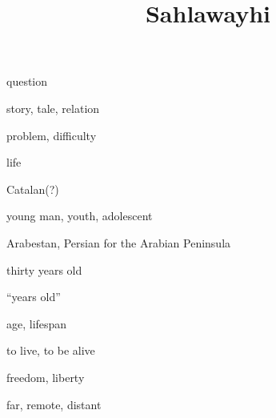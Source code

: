 \documentclass[avery5371,grid,frame]{flashcards}
\title{Sahlawayhi}
\begin{document}
\begin{flashcard}{\LARGE question}
\LARGE {}
\end{flashcard}
\begin{flashcard}{\LARGE story, tale, relation}
\LARGE {}
\end{flashcard}
\begin{flashcard}{\LARGE problem, difficulty}
\LARGE {}
\end{flashcard}
\begin{flashcard}{\LARGE life}
\LARGE {}
\end{flashcard}
\begin{flashcard}{\LARGE Catalan(?)}
\LARGE {}
\end{flashcard}
\begin{flashcard}{\LARGE young man, youth, adolescent}
\LARGE {}
\end{flashcard}
\begin{flashcard}{\LARGE Arabestan, Persian for the Arabian Peninsula}
\LARGE {}
\end{flashcard}
\begin{flashcard}{\LARGE thirty years old}
\LARGE {}
\end{flashcard}
\begin{flashcard}{\LARGE ``years old''}
\LARGE {}
\end{flashcard}
\begin{flashcard}{\LARGE age, lifespan}
\LARGE {}
\end{flashcard}
\begin{flashcard}{\LARGE to live, to be alive}
\LARGE {}
\end{flashcard}
\begin{flashcard}{\LARGE freedom, liberty}
\LARGE {}
\end{flashcard}
\begin{flashcard}{\LARGE far, remote, distant}
\LARGE {}
\end{flashcard}
\end{document}

